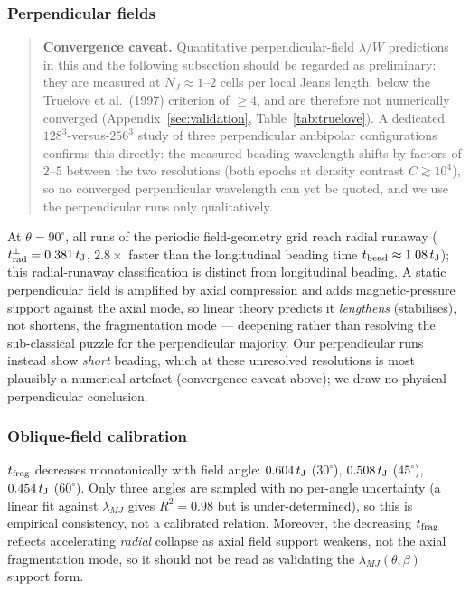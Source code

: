 \documentclass[usenatbib,twoside,twocolumn]{mnras}
\begin{document}
\subsubsection{Perpendicular fields}

\begin{quote}\sloppy\small
\textbf{Convergence caveat.} Quantitative perpendicular-field $\lambda/W$ predictions in this and the following subsection should be regarded as preliminary: they are measured at $N_J\approx1$--$2$ cells per local Jeans length, below the Truelove et al.\ (1997) criterion of $\geq4$, and are therefore not numerically converged (Appendix~\ref{sec:validation}, Table~\ref{tab:truelove}). A dedicated $128^3$-versus-$256^3$ study of three perpendicular ambipolar configurations confirms this directly: the measured beading wavelength shifts by factors of $2$--$5$ between the two resolutions (both epochs at density contrast $C\gtrsim10^4$), so no converged perpendicular wavelength can yet be quoted, and we use the perpendicular runs only qualitatively.
\end{quote}

At $\theta=90^\circ$, all runs of the periodic field-geometry grid reach radial runaway ($t_{\rm rad}^{\perp}=0.381\,t_{\rm J}$, $2.8\times$ faster than the longitudinal beading time $t_{\rm bead}\approx1.08\,t_{\rm J}$); this radial-runaway classification is distinct from longitudinal beading. A static perpendicular field is amplified by axial compression and adds magnetic-pressure support against the axial mode, so linear theory \citep{Nagasawa1987,Nakamura1993} predicts it \emph{lengthens} (stabilises), not shortens, the fragmentation mode --- deepening rather than resolving the sub-classical puzzle for the perpendicular majority. Our perpendicular runs instead show \emph{short} beading, which at these unresolved resolutions is most plausibly a numerical artefact (convergence caveat above); we draw no physical perpendicular conclusion.

\subsubsection{Oblique-field calibration}
$t_{\rm frag}$ decreases monotonically with field angle: $0.604\,t_{\rm J}$ ($30^\circ$), $0.508\,t_{\rm J}$ ($45^\circ$), $0.454\,t_{\rm J}$ ($60^\circ$). Only three angles are sampled with no per-angle uncertainty (a linear fit against $\lambda_{MJ}$ gives $R^2=0.98$ but is under-determined), so this is empirical consistency, not a calibrated relation. Moreover, the decreasing $t_{\rm frag}$ reflects accelerating \emph{radial} collapse as axial field support weakens, not the axial fragmentation mode, so it should not be read as validating the $\lambda_{MJ}(\theta,\beta)$ support form.
\end{document}

